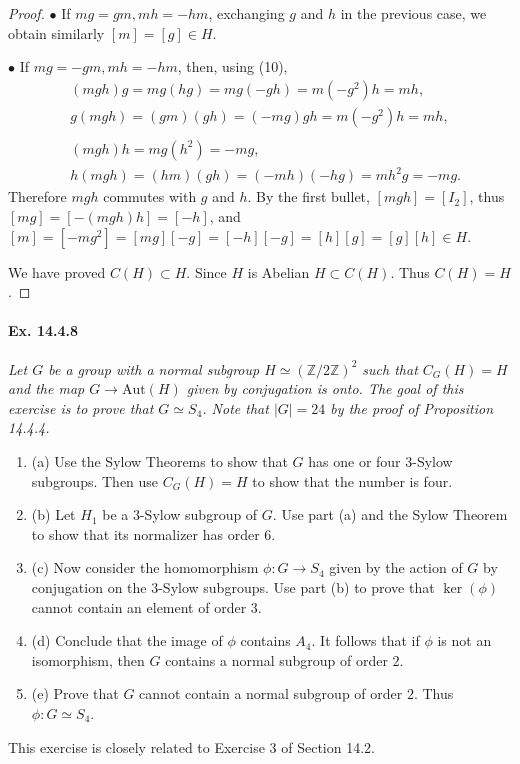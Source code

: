 \documentclass[11pt,a4paper]{article}
\newcommand{\be} {\begin{enumerate}}
\newcommand{\ee} {\end{enumerate}}
\newcommand{\Z}{\mathbb{Z}}
\begin{document}
{\begin{proof}
\item[$\bullet$] If $mg = gm, mh = -hm$, exchanging $g$ and $h$ in the previous case, we obtain similarly $[m] = [g] \in H$.

\item[$\bullet$] If $mg = -gm, mh = -hm$, then, using (10),
\begin{align*}
&(mgh) g = mg(hg) = mg(-gh) = m(-g^2) h = mh,\\
&g(mgh) = (gm)(gh) = (-mg)gh = m(-g^2)h = mh,\\
\\
&(mgh) h = mg(h^2) = -mg,\\
&h(mgh) = (hm)(gh) = (-mh)(-hg) = mh^2g = -mg.
\end{align*}
Therefore $mgh$ commutes with $g$ and $h$. By the first bullet, $[mgh] = [I_2]$, thus $[mg] = [-(mgh)h] = [-h]$, and $[m] = [-mg^2]= [mg][-g] = [-h][-g] = [h][g] = [g][h] \in H$. 

We have proved $C(H) \subset H$. Since $H$ is Abelian $H \subset C(H)$. Thus $C(H) = H$.
\end{proof}

\paragraph{Ex. 14.4.8}{\it Let $G$ be a group with a normal subgroup $H \simeq (\Z/2\Z)^2$ such that $C_G(H) = H$ and the map $G \to \mathrm{Aut}(H)$ given by conjugation is onto. The goal of this exercise is to prove that $G \simeq S_4$. Note that $|G| = 24$ by the proof of Proposition 14.4.4. 
\be
\item[(a)] Use the Sylow Theorems to show that $G$ has one or four $3$-Sylow subgroups. Then use $C_G(H) = H$ to show that the number is four.
\item[(b)] Let $H_1$ be a $3$-Sylow subgroup of $G$. Use part (a) and the Sylow Theorem to show that its normalizer has order $6$.
\item[(c)] Now consider the homomorphism $\phi : G \to S_4$ given by the action of $G$ by conjugation on the $3$-Sylow subgroups. Use part (b) to prove that $\ker(\phi)$ cannot contain an element of order $3$.
\item[(d)] Conclude that the image of $\phi$ contains $A_4$. It follows that if $\phi$ is not an isomorphism, then $G$ contains a normal subgroup of order $2$.
\item[(e)] Prove that $G$ cannot contain a normal subgroup of order $2$. Thus $\phi : G \simeq S_4$.
\ee
This exercise is closely related to Exercise 3 of Section 14.2.
}

}
\end{document}
